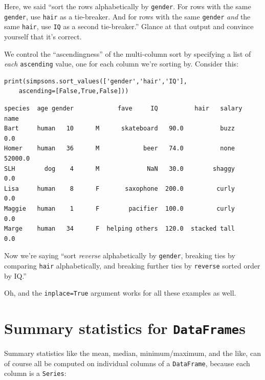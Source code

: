 Here, we said ``sort the rows alphabetically by \texttt{gender}. For rows with
the same \texttt{gender}, use \texttt{hair} as a tie-breaker. And for rows with
the same \texttt{gender} \textit{and} the same \texttt{hair}, use \texttt{IQ}
as a second tie-breaker.'' Glance at that output and convince yourself that
it's correct.

We control the ``ascendingness'' of the multi-column sort by specifying a list
of \textit{each} \texttt{ascending} value, one for each column we're sorting
by. Consider this:

\begin{samepage}
\begin{Verbatim}[fontsize=\small,samepage=true,frame=single,framesep=3mm]
print(simpsons.sort_values(['gender','hair','IQ'],
    ascending=[False,True,False]))
\end{Verbatim}
\vspace{-.2in}

\begin{Verbatim}[fontsize=\CBCodeSmall,samepage=true,frame=leftline,framesep=5mm,framerule=1mm]
       species  age gender            fave     IQ          hair   salary
name                                                                    
Bart     human   10      M      skateboard   90.0          buzz      0.0
Homer    human   36      M            beer   74.0          none  52000.0
SLH        dog    4      M             NaN   30.0        shaggy      0.0
Lisa     human    8      F       saxophone  200.0         curly      0.0
Maggie   human    1      F        pacifier  100.0         curly      0.0
Marge    human   34      F  helping others  120.0  stacked tall      0.0
\end{Verbatim}
\end{samepage}

Now we're saying ``sort \textit{reverse} alphabetically by \texttt{gender},
breaking ties by comparing \texttt{hair} alphabetically, and breaking further
ties by \texttt{reverse} sorted order by IQ.''

Oh, and the \texttt{inplace=True} argument works for all these examples as
well.

\section{Summary statistics for \texttt{DataFrame}s}


Summary statistics like the mean, median, minimum/maximum, and the like, can of
course all be computed on individual columns of a \texttt{DataFrame}, because
each column is a \texttt{Series}:

